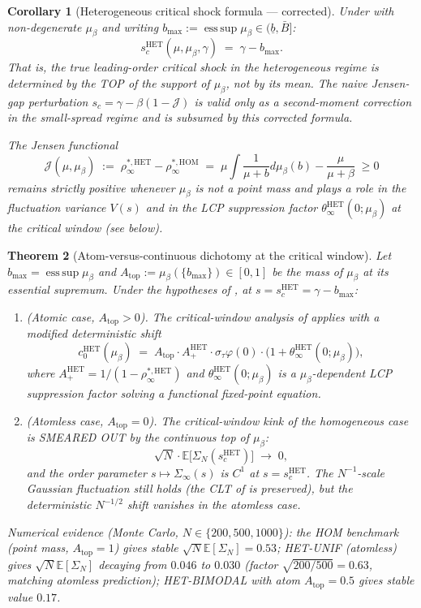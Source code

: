 \documentclass[11pt,a4paper]{article}
\newtheorem{theorem}{Theorem}[section]
\newtheorem{corollary}[theorem]{Corollary}
\theoremstyle{definition}
\newcommand{\SigmaN}{\Sigma_N}
\newcommand{\SigmaInf}{\Sigma_\infty}
\newcommand{\HOM}{\mathrm{HOM}}
\newcommand{\HET}{\mathrm{HET}}
\begin{document}
\begin{corollary}[Heterogeneous critical shock formula --- corrected]
\label{cor:6.2prime}
Under  with non-degenerate $\mu_\beta$ and writing
$b_{\max} := \operatorname{ess\,sup}\mu_\beta\in(\underline b,\bar B]$:
\[
\boxed{\;s_c^{\HET}(\mu,\mu_\beta,\gamma)\;=\;\gamma - b_{\max}.\;}
\]
That is, the true leading-order critical shock in the heterogeneous regime
is determined by the TOP of the support of $\mu_\beta$, not by its mean.
The naive Jensen-gap perturbation $s_c = \gamma - \beta(1 - \mathcal J)$ is
valid only as a second-moment correction in the small-spread regime and is
subsumed by this corrected formula.

The Jensen functional
\[
\mathcal J(\mu,\mu_\beta)\;:=\;\rho_\infty^{\ast,\HET} - \rho_\infty^{\ast,\HOM}\;=\;
\mu\int\frac{1}{\mu+b}d\mu_\beta(b) - \frac{\mu}{\mu+\beta}\;\geq 0
\]
remains strictly positive whenever $\mu_\beta$ is not a point mass and
plays a role in the fluctuation variance $V(s)$ and in the LCP suppression
factor $\theta_\infty^{\HET}(0;\mu_\beta)$ at the critical window (see
 below).
\end{corollary}

\begin{theorem}[Atom-versus-continuous dichotomy at the critical window]
\label{thm:atom-dichotomy}
Let $b_{\max} = \operatorname{ess\,sup}\mu_\beta$ and
$A_{\text{top}} := \mu_\beta(\{b_{\max}\})\in[0,1]$ be the mass of $\mu_\beta$ at
its essential supremum. Under the hypotheses of , at
$s = s_c^{\HET} = \gamma - b_{\max}$:
\begin{enumerate}[leftmargin=1.5em]
\item {\rm(Atomic case, $A_{\text{top}}>0$)}. The critical-window analysis of
   applies with a modified deterministic shift
  \[
  c_0^{\HET}(\mu_\beta)\;=\;A_{\text{top}}\cdot A_+^{\HET}\cdot\sigma_\tau\varphi(0)\cdot\bigl(1+\theta_\infty^{\HET}(0;\mu_\beta)\bigr),
  \]
  where $A_+^{\HET} = 1/(1 - \rho_\infty^{\ast,\HET})$ and
  $\theta_\infty^{\HET}(0;\mu_\beta)$ is a $\mu_\beta$-dependent LCP
  suppression factor solving a functional fixed-point equation.
\item {\rm(Atomless case, $A_{\text{top}}=0$)}. The critical-window kink of the
  homogeneous case is SMEARED OUT by the continuous top of $\mu_\beta$:
  \[
  \sqrt N\cdot\mathbb E\bigl[\SigmaN(s_c^{\HET})\bigr]\;\longrightarrow\;0,
  \]
  and the order parameter $s\mapsto\SigmaInf(s)$ is $C^1$ at $s = s_c^{\HET}$.
  The $N^{-1}$-scale Gaussian fluctuation still holds (the CLT of
   is preserved), but the deterministic $N^{-1/2}$ shift
  vanishes in the atomless case.
\end{enumerate}
Numerical evidence (Monte Carlo, $N\in\{200,500,1000\}$): the HOM benchmark
(point mass, $A_{\text{top}} = 1$) gives stable $\sqrt N\mathbb E[\SigmaN] = 0.53$;
HET-UNIF (atomless) gives $\sqrt N\mathbb E[\SigmaN]$ decaying from $0.046$
to $0.030$ (factor $\sqrt{200/500} = 0.63$, matching atomless prediction);
HET-BIMODAL with atom $A_{\text{top}} = 0.5$ gives stable value $0.17$.
\end{theorem}
\end{document}
